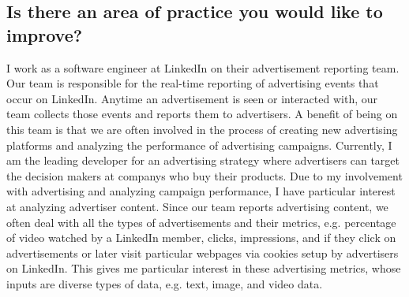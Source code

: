 \subsection{Is there an area of practice you would like to improve?}

I work as a software engineer at LinkedIn on their advertisement reporting team.  Our team is responsible for the real-time reporting of advertising events that occur on LinkedIn.  Anytime an advertisement is seen or interacted with, our team collects those events and reports them to advertisers.  A benefit of being on this team is that we are often involved in the process of creating new advertising platforms and analyzing the performance of advertising campaigns.  Currently, I am the leading developer for an advertising strategy where advertisers can target the decision makers at companys who buy their products.  Due to my involvement with advertising and analyzing campaign performance, I have particular interest at analyzing advertiser content.  Since our team reports advertising content, we often deal with all the types of advertisements and their metrics, e.g. percentage of video watched by a LinkedIn member, clicks, impressions, and if they click on advertisements or later visit particular webpages via cookies setup by advertisers on LinkedIn.  This gives me particular interest in these advertising metrics, whose inputs are diverse types of data, e.g. text, image, and video data.

